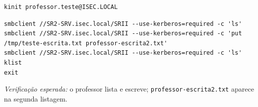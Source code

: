 
\begin{lstlisting}[style=bashstyle]
kinit professor.teste@ISEC.LOCAL
\end{lstlisting}


\begin{lstlisting}[style=bashstyle]
smbclient //SR2-SRV.isec.local/SRII --use-kerberos=required -c 'ls'
smbclient //SR2-SRV.isec.local/SRII --use-kerberos=required -c 'put /tmp/teste-escrita.txt professor-escrita2.txt'
smbclient //SR2-SRV.isec.local/SRII --use-kerberos=required -c 'ls'
klist
exit
\end{lstlisting}

\emph{Verificação esperada:} o professor lista e escreve; \texttt{professor-escrita2.txt} aparece na segunda listagem.

